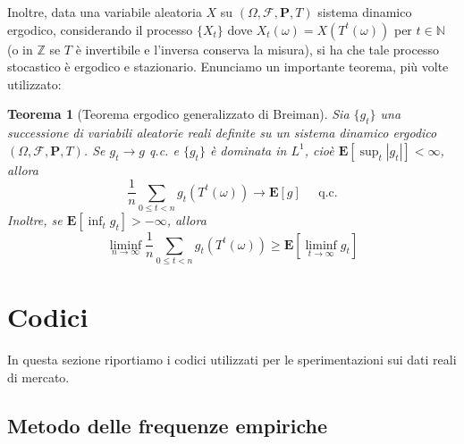 \documentclass[a4paper,11pt]{book}
\theoremstyle{plain}
\newtheorem{teo}{Teorema}[chapter]
\theoremstyle{definition}
\theoremstyle{remark}
\newcommand{\Z}{\mathbb{Z}}
\newcommand{\N}{\mathbb{N}}
\newcommand{\F}{\mathcal{F}}
\newcommand{\Pro}{\mathbf{P}}
\newcommand{\E}{\mathbf{E}}
\begin{document}
Inoltre, data una variabile aleatoria $X$ su $(\Omega,\F,\Pro,T)$ sistema dinamico ergodico, considerando il processo $\{X_t\}$ dove $X_t (\omega)= X(T^t(\omega))$ per $t \in \N$ (o in $\Z$ se $T$ è invertibile e l'inversa conserva la misura), si ha che tale processo stocastico è ergodico e stazionario.\newline
Enunciamo un importante teorema, più volte utilizzato:
\begin{teo}[Teorema ergodico generalizzato di Breiman]
	Sia $\{g_t\}$ una successione di variabili aleatorie reali definite su un sistema dinamico ergodico $(\Omega, \F,\Pro,T)$. Se $g_t\rightarrow g$ q.c. e $\{g_t\}$ è dominata in $L^1$, cioè $\E[\sup_t|g_t|]<\infty$, allora
	\begin{equation}\label{teo:erg1}
	\frac{1}{n}\sum_{0\leq t <n}{g_t(T^t(\omega))}\rightarrow \E[g]\;\;\;\;\; \text{q.c.}
	\end{equation}
	Inoltre, se $\E[\inf_tg_t]>-\infty$, allora
	\begin{equation}\label{teo:erg2}
	\liminf_{n\to\infty}\frac{1}{n}\sum_{0\leq t <n}{g_t(T^t(\omega))}\geq \E[\liminf_{t\to\infty}g_t]
	\end{equation}
\end{teo}


\chapter{Codici}
In questa sezione riportiamo i codici utilizzati per le sperimentazioni sui dati reali di mercato.
\section{Metodo delle frequenze empiriche}




\end{document}

